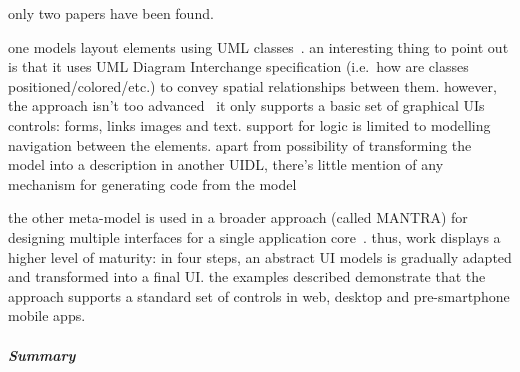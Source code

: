 only two papers have been found.

one models layout elements using UML classes~\cite{Blankenhorn2004-og}.
an interesting thing to point out is that it uses UML Diagram Interchange specification (i.e.~how are classes positioned/colored/etc.) to convey spatial relationships between them.
however, the approach isn't too advanced \textemdash\ it only supports a basic set of graphical UIs controls: forms, links images and text.
support for logic is limited to modelling navigation between the elements.
apart from possibility of transforming the model into a description in another UIDL, there's little mention of any mechanism for generating code from the model

the other meta-model is used in a broader approach (called MANTRA) for designing multiple interfaces for a single application core~\cite{Botterweck2011-ra}.
thus, work displays a higher level of maturity: in four steps, an abstract UI models is gradually adapted and transformed into a final UI.
the examples described demonstrate that the approach supports a standard set of controls in web, desktop and pre-smartphone mobile apps.

\subparagraph{Summary}

